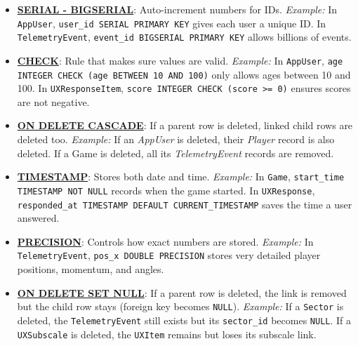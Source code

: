 \documentclass[11pt]{article}
\begin{document}
\begin{itemize}
  \item \href{https://www.geeksforgeeks.org/postgresql/postgresql-serial/}{\textbf{SERIAL - BIGSERIAL}}: Auto-increment numbers for IDs.  
    \textit{Example:} In \texttt{AppUser}, \texttt{user\_id SERIAL PRIMARY KEY} gives each user a unique ID. In \texttt{TelemetryEvent}, \texttt{event\_id BIGSERIAL PRIMARY KEY} allows billions of events.

  \item \href{https://www.w3schools.com/sql/sql_check.asp}{\textbf{CHECK}}: Rule that makes sure values are valid.  
    \textit{Example:} In \texttt{AppUser}, \texttt{age INTEGER CHECK (age BETWEEN 10 AND 100)} only allows ages between 10 and 100. In \texttt{UXResponseItem}, \texttt{score INTEGER CHECK (score >= 0)} ensures scores are not negative.

  \item \href{https://www.geeksforgeeks.org/sql/cascade-in-sql/}{\textbf{ON DELETE CASCADE}}: If a parent row is deleted, linked child rows are deleted too.  
    \textit{Example:} If an \textit{AppUser} is deleted, their \textit{Player} record is also deleted. If a Game is deleted, all its \textit{TelemetryEvent} records are removed.

  \item \href{https://www.w3resource.com/PostgreSQL/date-time-functions-and-operators.php}{\textbf{TIMESTAMP}}: Stores both date and time.  
    \textit{Example:} In \texttt{Game}, \texttt{start\_time TIMESTAMP NOT NULL} records when the game started. In \texttt{UXResponse}, \texttt{responded\_at TIMESTAMP DEFAULT CURRENT\_TIMESTAMP} saves the time a user answered.

  \item \href{https://www.postgresql.org/docs/current/datatype-numeric.html}{\textbf{PRECISION}}: Controls how exact numbers are stored.  
    \textit{Example:} In \texttt{TelemetryEvent}, \texttt{pos\_x DOUBLE PRECISION} stores very detailed player positions, momentum, and angles.
    
  \item \href{https://www.postgresql.org/docs/current/ddl-constraints.html}{\textbf{ON DELETE SET NULL}}: If a parent row is deleted, the link is removed but the child row stays (foreign key becomes \texttt{NULL}).  
    \textit{Example:} If a \texttt{Sector} is deleted, the \texttt{TelemetryEvent} still exists but its \texttt{sector\_id} becomes \texttt{NULL}. If a \texttt{UXSubscale} is deleted, the \texttt{UXItem} remains but loses its subscale link.
\end{itemize}
\end{document}
